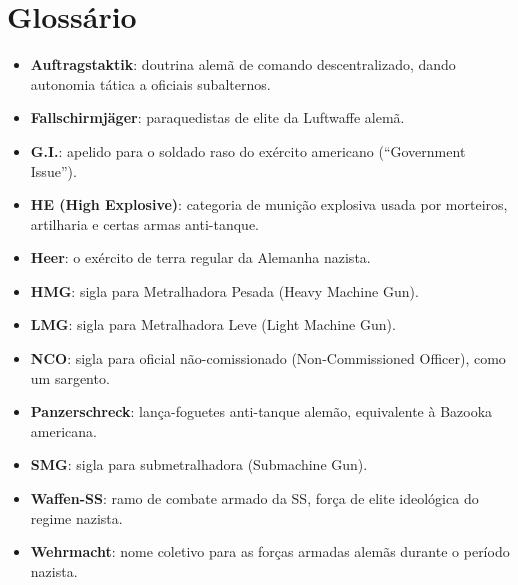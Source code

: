 \clearpage
\section*{Glossário}

\begin{itemize}[leftmargin=1.2cm]
  \item \textbf{Auftragstaktik}: doutrina alemã de comando descentralizado, dando autonomia tática a oficiais subalternos.
  \item \textbf{Fallschirmjäger}: paraquedistas de elite da Luftwaffe alemã.
  \item \textbf{G.I.}: apelido para o soldado raso do exército americano (``Government Issue'').
  \item \textbf{HE (High Explosive)}: categoria de munição explosiva usada por morteiros, artilharia e certas armas anti-tanque.
  \item \textbf{Heer}: o exército de terra regular da Alemanha nazista.
  \item \textbf{HMG}: sigla para Metralhadora Pesada (Heavy Machine Gun).
  \item \textbf{LMG}: sigla para Metralhadora Leve (Light Machine Gun).
  \item \textbf{NCO}: sigla para oficial não-comissionado (Non-Commissioned Officer), como um sargento.
  \item \textbf{Panzerschreck}: lança-foguetes anti-tanque alemão, equivalente à Bazooka americana.
  \item \textbf{SMG}: sigla para submetralhadora (Submachine Gun).
  \item \textbf{Waffen-SS}: ramo de combate armado da SS, força de elite ideológica do regime nazista.
  \item \textbf{Wehrmacht}: nome coletivo para as forças armadas alemãs durante o período nazista.
\end{itemize}
